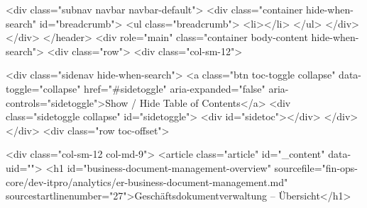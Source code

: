        <div class="subnav navbar navbar-default">
          <div class="container hide-when-search" id="breadcrumb">
            <ul class="breadcrumb">
              <li></li>
            </ul>
          </div>
        </div>
      </header>
      <div role="main" class="container body-content hide-when-search">
        <div class="row">
          <div class="col-sm-12">
            
<div class="sidenav hide-when-search"> 
  <a class="btn toc-toggle collapse" data-toggle="collapse" href="#sidetoggle" aria-expanded="false" aria-controls="sidetoggle">Show / Hide Table of Contents</a>
  <div class="sidetoggle collapse" id="sidetoggle">
    <div id="sidetoc"></div>
  </div>
</div>
            <div class="row toc-offset">
              
              <div class="col-sm-12 col-md-9">
                <article class="article" id="_content" data-uid="">
<h1 id="business-document-management-overview" sourcefile="fin-ops-core/dev-itpro/analytics/er-business-document-management.md" sourcestartlinenumber="27">Geschäftsdokumentverwaltung – Übersicht</h1>

